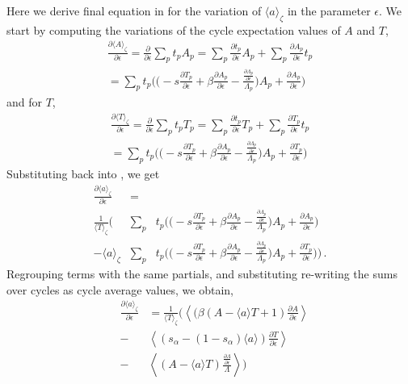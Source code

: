 \documentclass[aps,pre,
                showpacs,
                twocolumn,
                groupedaddress,
                floatfix]{revtex4-1}
\begin{document}
Here we derive final equation in  for the
variation of $\langle a\rangle_{\zeta}$ in the parameter $\epsilon$. We
start by computing the variations of the cycle expectation values of $A$
and $T$,
\begin{eqnarray*}
\frac{\partial \langle A \rangle_{\zeta}}{\partial \epsilon} = \frac{\partial}{\partial \epsilon}\sum_{p}t_{p}A_{p} = \sum_{p}\frac{\partial t_{p}}{\partial \epsilon}A_{p} + \sum_{p} \frac{\partial A_{p}}{\partial \epsilon} t_{p}
\\ = \sum_{p}t_{p}\Bigg( \Bigg( -s\frac{\partial T_{p}}{\partial \epsilon} + \beta \frac{\partial A_{p}}{\partial \epsilon} - \frac{\frac{\partial \Lambda_{p}}{\partial \epsilon}}{\Lambda_{p}}\Bigg) A_{p} +\frac{\partial A_{p}}{\partial \epsilon} \Bigg)
\end{eqnarray*}
and for $T$,
\begin{eqnarray*}
\frac{\partial \langle T \rangle_{\zeta}}{\partial \epsilon} = \frac{\partial}{\partial \epsilon}\sum_{p}t_{p}T_{p} = \sum_{p}\frac{\partial t_{p}}{\partial \epsilon}T_{p} + \sum_{p} \frac{\partial T_{p}}{\partial \epsilon} t_{p}
\\ = \sum_{p}t_{p}\Bigg( \Bigg( -s\frac{\partial T_{p}}{\partial \epsilon} + \beta \frac{\partial A_{p}}{\partial \epsilon} - \frac{\frac{\partial \Lambda_{p}}{\partial \epsilon}}{\Lambda_{p}}\Bigg) A_{p} +\frac{\partial T_{p}}{\partial \epsilon} \Bigg)
\end{eqnarray*}
Substituting back into , we get
\begin{eqnarray*}
\frac{\partial \langle a \rangle_{\zeta}}{\partial \epsilon} &=&
\\ \frac{1}{\langle T\rangle_{\zeta}}\Bigg( &\sum_{p}&t_{p}\Bigg( \Bigg( -s\frac{\partial T_{p}}{\partial \epsilon} + \beta \frac{\partial A_{p}}{\partial \epsilon} - \frac{\frac{\partial \Lambda_{p}}{\partial \epsilon}}{\Lambda_{p}}\Bigg) A_{p} +\frac{\partial A_{p}}{\partial \epsilon} \Bigg)
\\ - \langle a \rangle_{\zeta} &\sum_{p}&t_{p}\Bigg( \Bigg( -s\frac{\partial T_{p}}{\partial \epsilon} + \beta \frac{\partial A_{p}}{\partial \epsilon} - \frac{\frac{\partial \Lambda_{p}}{\partial \epsilon}}{\Lambda_{p}}\Bigg) A_{p} +\frac{\partial T_{p}}{\partial \epsilon} \Bigg) \Bigg)
\,.
\end{eqnarray*}
Regrouping terms with the same partials, and substituting re-writing the
sums  over cycles as cycle average values, we obtain,
\begin{eqnarray*}
&\frac{\partial \langle a\rangle_{\zeta}}{\partial \epsilon}& = \frac{1}{\langle T \rangle_{\zeta}}\Bigg( \left\langle (\beta(A-\langle a\rangle T + 1)\frac{\partial A}{\partial \epsilon}\right\rangle \\ &-& \left\langle (s_{\alpha}-(1-s_{\alpha})\langle a\rangle)\frac{\partial T}{\partial \epsilon}\right\rangle  \\
&-&\left\langle (A-\langle a \rangle T) \frac{\frac{\partial \Lambda}{\partial \epsilon}}{\Lambda}\right\rangle \Bigg)
\end{eqnarray*}

\ifboyscout
%    
\fi




\end{document}
